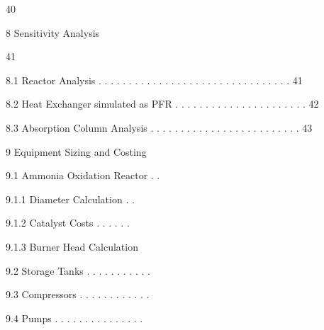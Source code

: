 \documentclass[a4paper,portrait,12pt]{article}
\begin{document}
40





\begin{flushleft}
8 Sensitivity Analysis
\end{flushleft}


41


\begin{flushleft}
8.1 Reactor Analysis . . . . . . . . . . . . . . . . . . . . . . . . . . . . . . . . 41
\end{flushleft}


\begin{flushleft}
8.2 Heat Exchanger simulated as PFR . . . . . . . . . . . . . . . . . . . . . . 42
\end{flushleft}


\begin{flushleft}
8.3 Absorption Column Analysis . . . . . . . . . . . . . . . . . . . . . . . . . 43
\end{flushleft}


\begin{flushleft}
9 Equipment Sizing and Costing
\end{flushleft}


\begin{flushleft}
9.1 Ammonia Oxidation Reactor . .
\end{flushleft}


\begin{flushleft}
9.1.1 Diameter Calculation . .
\end{flushleft}


\begin{flushleft}
9.1.2 Catalyst Costs . . . . . .
\end{flushleft}


\begin{flushleft}
9.1.3 Burner Head Calculation
\end{flushleft}


\begin{flushleft}
9.2 Storage Tanks . . . . . . . . . . .
\end{flushleft}


\begin{flushleft}
9.3 Compressors . . . . . . . . . . . .
\end{flushleft}


\begin{flushleft}
9.4 Pumps . . . . . . . . . . . . . . .
\end{flushleft}
\end{document}
